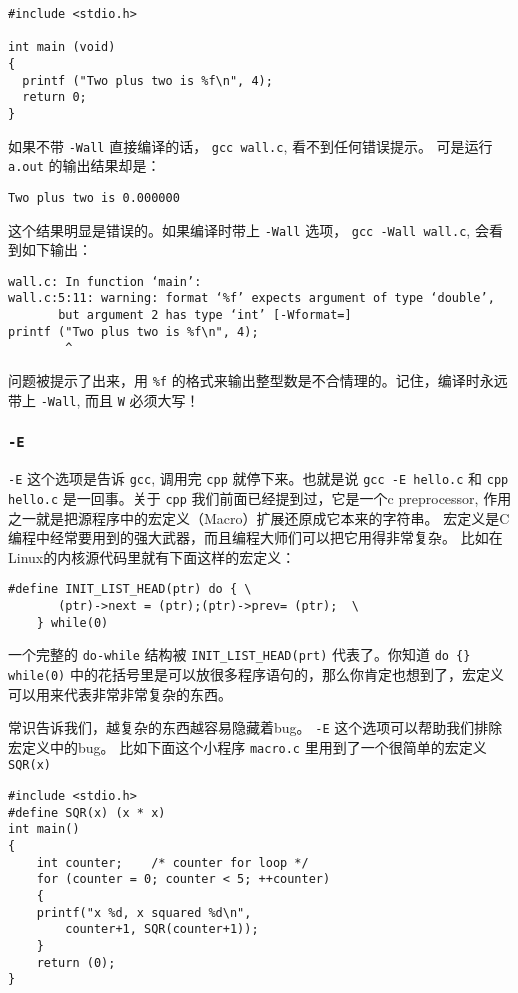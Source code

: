 \documentclass{wx672article}
\begin{document}
\begin{verbatim}
#include <stdio.h>

int main (void)
{
  printf ("Two plus two is %f\n", 4);
  return 0;
}
\end{verbatim}

如果不带 \texttt{-Wall} 直接编译的话， \texttt{gcc wall.c}, 看不到任何错误提示。
可是运行 \texttt{a.out} 的输出结果却是：
\begin{verbatim}
Two plus two is 0.000000
\end{verbatim}
这个结果明显是错误的。如果编译时带上 \texttt{-Wall} 选项， \texttt{gcc -Wall wall.c}, 会看到如下输出：
\begin{verbatim}
wall.c: In function ‘main’:
wall.c:5:11: warning: format ‘%f’ expects argument of type ‘double’,
       but argument 2 has type ‘int’ [-Wformat=]
printf ("Two plus two is %f\n", 4);
        ^
\end{verbatim}
问题被提示了出来，用 \texttt{\%f} 的格式来输出整型数是不合情理的。记住，编译时永远带上
\texttt{-Wall}, 而且 \texttt{W} 必须大写！

\subsubsection{\texttt{-E}}

\texttt{-E} 这个选项是告诉 \texttt{gcc}, 调用完 \texttt{cpp} 就停下来。也就是说 \texttt{gcc -E hello.c} 和 \texttt{cpp
    hello.c} 是一回事。关于 \texttt{cpp} 我们前面已经提到过，它是一个c preprocessor,
作用之一就是把源程序中的宏定义（Macro）扩展还原成它本来的字符串。
宏定义是C编程中经常要用到的强大武器，而且编程大师们可以把它用得非常复杂。
比如在Linux的内核源代码里就有下面这样的宏定义：
\begin{verbatim}
#define INIT_LIST_HEAD(ptr) do { \
	   (ptr)->next = (ptr);(ptr)->prev= (ptr);  \
	} while(0)
\end{verbatim}
一个完整的 \texttt{do-while} 结构被 \texttt{INIT\_LIST\_HEAD(prt)} 代表了。你知道 \texttt{do \{\} while(0)}
中的花括号里是可以放很多程序语句的，那么你肯定也想到了，宏定义可以用来代表非常非常复杂的东西。

常识告诉我们，越复杂的东西越容易隐藏着bug。 \texttt{-E} 这个选项可以帮助我们排除宏定义中的bug。
比如下面这个小程序 \texttt{macro.c} 里用到了一个很简单的宏定义 \texttt{SQR(x)}

\begin{verbatim}
#include <stdio.h>
#define SQR(x) (x * x)
int main()
{
    int counter;    /* counter for loop */
    for (counter = 0; counter < 5; ++counter)
    {
	printf("x %d, x squared %d\n",
	    counter+1, SQR(counter+1));
    }
    return (0);
}
\end{verbatim}
\end{document}

